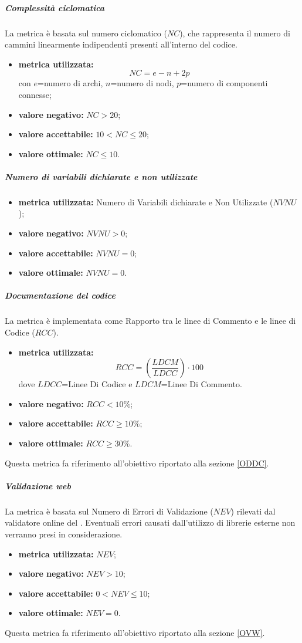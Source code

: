 				\subparagraph{Complessità ciclomatica}
				\label{MCCIC}
				La metrica è basata sul numero ciclomatico ($NC$), che rappresenta il numero di cammini linearmente indipendenti presenti all'interno del codice.
				
				\begin{itemize}
					\item \textbf{metrica utilizzata:} $$NC=e-n+2p$$ 
					con $e$=numero di archi, $n$=numero di nodi, $p$=numero di componenti connesse;
					\item \textbf{valore negativo:} $NC>20$;
					\item \textbf{valore accettabile:} $10<NC \leq 20$;
					\item \textbf{valore ottimale:} $NC\leq10$.
				\end{itemize}
			
				\subparagraph{Numero di variabili dichiarate e non utilizzate}
				\label{MNDVDENU}
				\begin{itemize}
					\item \textbf{metrica utilizzata:} Numero di Variabili dichiarate e Non Utilizzate ($NVNU$);
					\item \textbf{valore negativo:} $NVNU>0$;
					\item \textbf{valore accettabile:} $NVNU=0$;
					\item \textbf{valore ottimale:} $NVNU=0$.
				\end{itemize}
			
			
				\subparagraph{Documentazione del codice}
				\label{MDDC}
				La metrica è implementata come Rapporto tra le linee di Commento e le linee di Codice ($RCC$).
				\begin{itemize}
					\item \textbf{metrica utilizzata:} $$RCC=\left(\frac{LDCM}{LDCC}\right)\cdot 100$$
					dove $LDCC$=Linee Di Codice e $LDCM$=Linee Di Commento.
					\item \textbf{valore negativo:} $RCC<10\%$;
					\item \textbf{valore accettabile:} $RCC\geq 10\%$;
					\item \textbf{valore ottimale:} $RCC\geq 30\%$.
				\end{itemize}
				Questa metrica fa riferimento all'obiettivo riportato alla sezione \ref{ODDC}.
			
			
				\subparagraph{Validazione web}
				\label{MVW}
				La metrica è basata sul Numero di Errori di Validazione ($NEV$) rilevati dal validatore online del . Eventuali errori causati dall'utilizzo di librerie esterne non verranno presi in considerazione.
				\begin{itemize}
					\item \textbf{metrica utilizzata:} $NEV$;
					\item \textbf{valore negativo:} $NEV>10$;
					\item \textbf{valore accettabile:} $0<NEV\leq 10$;
					\item \textbf{valore ottimale:} $NEV=0$.
				\end{itemize}
				Questa metrica fa riferimento all'obiettivo riportato alla sezione \ref{OVW}.
				
